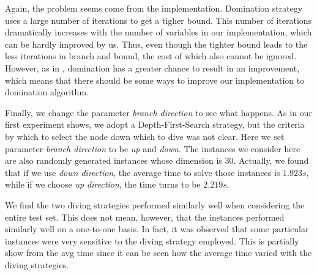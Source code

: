 \documentclass[a4paper,11pt]{article}
\begin{document}
Again, the problem seems come from the implementation. Domination strategy uses a large number of iterations to get a tigher bound. This number of iterations dramatically increases with the number of variables in our implementation, which can be hardly improved by us. Thus, even though the tighter bound leads to the less iterations in branch and bound, the cost of which also cannot be ignored. However, as in \cite{fukasawa2011exact}, domination has a greater chance to result in an improvement, which means that there should be some ways to improve our implementation to domination algorithm.

Finally, we change the parameter \textit{branch direction} to see what happens. As in our first experiment shows, we adopt a Depth-First-Search strategy, but the criteria by which to select the node down which to dive was not clear. Here we set parameter \textit{branch direction} to be \textit{up} and \textit{down}. The instances we consider here are also randomly generated instances whose dimension is $30$. Actually, we found that if we use \textit{down direction}, the average time to solve those instances is $1.923s$, while if we choose \textit{up direction}, the time turns to be $2.219s$. 

We find the two diving strategies performed similarly well when considering the entire test set. This does not mean, however, that the instances performed similarly well on a one-to-one basis. In fact, it was observed that some particular instances were very sensitive to the diving strategy employed. This is partially show from the avg time since it can be seen how the average time varied with the diving strategies.
\end{document}
